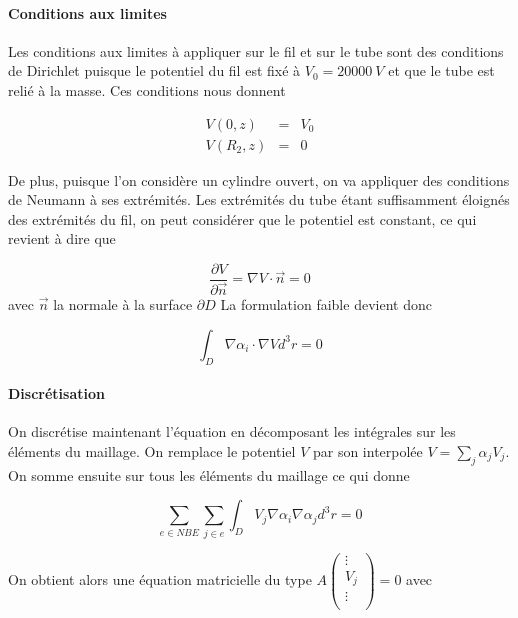 \documentclass[a4paper,12pt]{article}
\begin{document}
\paragraph{Conditions aux limites}
Les conditions aux limites à appliquer sur le fil et sur le tube sont des conditions de Dirichlet puisque le potentiel du fil est fixé à $V_0=\SI{20000}{V}$ et que le tube est relié à la masse. Ces conditions nous donnent



\begin{eqnarray}
V(0,z) &=& V_0 \\
V(R_2,z) &=& 0
\end{eqnarray}


De plus, puisque l'on considère un cylindre ouvert, on va appliquer des conditions de Neumann à ses extrémités. Les extrémités du tube étant suffisamment éloignés des extrémités du fil, on peut considérer que le potentiel est constant, ce qui revient à dire que

\begin{equation}
\frac{\partial V}{\partial \vec{n} } = \nabla V \cdot \vec{n} = 0
\end{equation}
avec $\vec{n}$ la normale à la surface $\partial D$
La formulation faible devient donc

\begin{equation}
\int_{D} \nabla \alpha_i \cdot \nabla V d^3 r = 0
\end{equation}

\paragraph{Discrétisation}
On discrétise maintenant l'équation en décomposant les intégrales sur les éléments du maillage. On remplace le potentiel $V$ par son interpolée $V = \sum_{j} \alpha_j V_j$. On somme ensuite sur tous les éléments du maillage ce qui donne

\begin{equation}
\sum_{e \in NBE} \sum_{j \in e} \int_{D} V_j \nabla \alpha_i \nabla \alpha_j d^3 r = 0
\end{equation}

On obtient alors une équation matricielle du type $A 
\left( \begin{array}{c}
\vdots \\
V_j \\
\vdots \\
\end{array} \right) 
 = 0$ avec
\end{document}
